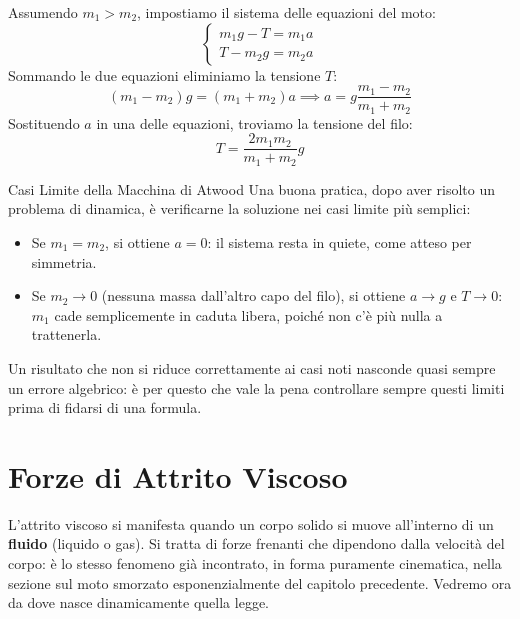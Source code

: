 Assumendo $m_1 > m_2$, impostiamo il sistema delle equazioni del moto:
\begin{equation}
    \begin{cases}
    m_1 g - T = m_1 a \\
    T - m_2 g = m_2 a
\end{cases}
\end{equation}
Sommando le due equazioni eliminiamo la tensione $T$:
\begin{equation}
    (m_1 - m_2)g = (m_1 + m_2)a \implies \boxed{a = g \frac{m_1 - m_2}{m_1 + m_2}}
\end{equation}
Sostituendo $a$ in una delle equazioni, troviamo la tensione del filo:
\begin{equation}
    \boxed{T = \frac{2 m_1 m_2}{m_1 + m_2} g}
\end{equation}

\begin{osservazione}{Casi Limite della Macchina di Atwood}
Una buona pratica, dopo aver risolto un problema di dinamica, è verificarne la soluzione nei casi limite più semplici:
\begin{itemize}
    \item Se $m_1 = m_2$, si ottiene $a = 0$: il sistema resta in quiete, come atteso per simmetria.
    \item Se $m_2 \to 0$ (nessuna massa dall'altro capo del filo), si ottiene $a \to g$ e $T \to 0$: $m_1$ cade semplicemente in caduta libera, poiché non c'è più nulla a trattenerla.
\end{itemize}
Un risultato che non si riduce correttamente ai casi noti nasconde quasi sempre un errore algebrico: è per questo che vale la pena controllare sempre questi limiti prima di fidarsi di una formula.
\end{osservazione}

\section{Forze di Attrito Viscoso}
L'attrito viscoso si manifesta quando un corpo solido si muove all'interno di un \textbf{fluido} (liquido o gas). Si tratta di forze frenanti che dipendono dalla velocità del corpo: è lo stesso fenomeno già incontrato, in forma puramente cinematica, nella sezione sul moto smorzato esponenzialmente del capitolo precedente. Vedremo ora da dove nasce dinamicamente quella legge.

